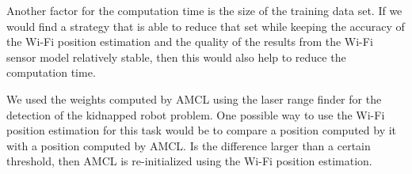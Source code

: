 Another factor for the computation time is the size of the training data set. If we would find a strategy that is able to reduce that set while keeping the accuracy of the Wi-Fi position estimation and the quality of the results from the Wi-Fi sensor model relatively stable, then this would also help to reduce the computation time.

We used the weights computed by AMCL using the laser range finder for the detection of the kidnapped robot problem. One possible way to use the Wi-Fi position estimation for this task would be to compare a position computed by it with a position computed by AMCL. Is the difference larger than a certain threshold, then AMCL is re-initialized using the Wi-Fi position estimation. 